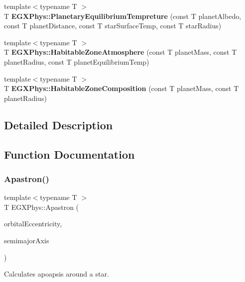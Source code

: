 \begin{DoxyCompactItemize}
{\footnotesize template$<$typename T $>$ }\\T {\bfseries E\+G\+X\+Phys\+::\+Planetary\+Equilibrium\+Tempreture} (const T planet\+Albedo, const T planet\+Distance, const T star\+Surface\+Temp, const T star\+Radius)
\item 
\mbox{\label{group___astrophysics_ga0814237dccfe3c968b97fa6c93aeca27}} 
{\footnotesize template$<$typename T $>$ }\\T {\bfseries E\+G\+X\+Phys\+::\+Habitable\+Zone\+Atmosphere} (const T planet\+Mass, const T planet\+Radius, const T planet\+Equilibrium\+Temp)
\item 
\mbox{\label{group___astrophysics_ga14ab036f8c617512236522c8e31dd072}} 
{\footnotesize template$<$typename T $>$ }\\T {\bfseries E\+G\+X\+Phys\+::\+Habitable\+Zone\+Composition} (const T planet\+Mass, const T planet\+Radius)
\end{DoxyCompactItemize}


\subsection{Detailed Description}


\subsection{Function Documentation}
\mbox{\label{group___astrophysics_ga2fc1c406ce10f59b4f325150aecd279a}} 
\subsubsection{\texorpdfstring{Apastron()}{Apastron()}}
{\footnotesize\ttfamily template$<$typename T $>$ \\
T E\+G\+X\+Phys\+::\+Apastron (\begin{DoxyParamCaption}\item[{const T \&}]{orbital\+Eccentricity,  }\item[{const T \&}]{semimajor\+Axis }\end{DoxyParamCaption})}



Calculates apoapsis around a star. 

